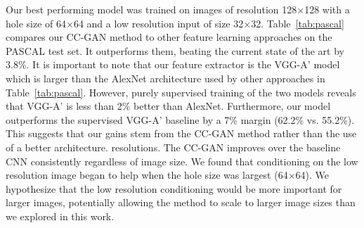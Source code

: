 \documentclass{article} %
\newcommand{\tab}[1]{Table~\ref{tab:#1}}
\begin{document}
Our best performing model was trained on images of resolution
128$\times$128 with a hole size of 64$\times$64 and a low resolution
input of size 32$\times$32.  \tab{pascal} compares our CC-GAN method
to other feature learning approaches on the PASCAL test set. It
outperforms them, beating the current state of the art \citep{wang2015} by 3.8\%. It is
important to note that our feature extractor is the VGG-A' model which
is larger than the AlexNet architecture \citep{krizhevsky2012} used by
other approaches in \tab{pascal}.  However, purely supervised training
of the two models reveals that VGG-A' is less than 2\% better than
AlexNet. Furthermore, our model outperforms the supervised VGG-A'
baseline by a 7\% margin (62.2\% vs. 55.2\%).  This suggests that our
gains stem from the CC-GAN method rather than the use of a better
architecture.
resolutions.  The CC-GAN improves over the baseline CNN consistently
regardless of image size.  We found that conditioning on the low
resolution image began to help when the hole size was largest
(64$\times$64).  We hypothesize that the low resolution conditioning
would be more important for larger images, potentially allowing the
method to scale to larger image sizes than we explored in this work.
\end{document}
